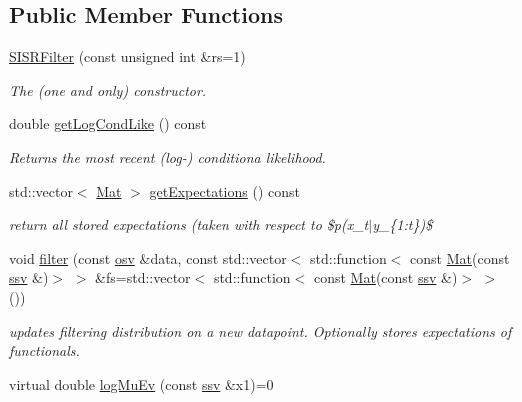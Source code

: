 \subsection*{Public Member Functions}
\begin{DoxyCompactItemize}
\item 
\hyperlink{classSISRFilter_a65ebfb131996dba6a92291e26bad33d2}{S\+I\+S\+R\+Filter} (const unsigned int \&rs=1)
\begin{DoxyCompactList}\small\item\em The (one and only) constructor. \end{DoxyCompactList}\item 
double \hyperlink{classSISRFilter_a2f100a9877d3bb1e94e723e892a39ede}{get\+Log\+Cond\+Like} () const 
\begin{DoxyCompactList}\small\item\em Returns the most recent (log-\/) conditiona likelihood. \end{DoxyCompactList}\item 
std\+::vector$<$ \hyperlink{classSISRFilter_a6563da123e66df0b1140140a5b40d535}{Mat} $>$ \hyperlink{classSISRFilter_a10900ed31e94f3a40b68f1e202cb8b5a}{get\+Expectations} () const 
\begin{DoxyCompactList}\small\item\em return all stored expectations (taken with respect to \$p(x\+\_\+t$\vert$y\+\_\+\{1\+:t\})\$ \end{DoxyCompactList}\item 
void \hyperlink{classSISRFilter_afbffd9e3ff6cc7171f4c9f7052bf9581}{filter} (const \hyperlink{classSISRFilter_ad3449fbd43f19dbda6b80459d729d9bf}{osv} \&data, const std\+::vector$<$ std\+::function$<$ const \hyperlink{classSISRFilter_a6563da123e66df0b1140140a5b40d535}{Mat}(const \hyperlink{classSISRFilter_aeaa3ff0465a0b260710a17238a95212c}{ssv} \&)$>$ $>$ \&fs=std\+::vector$<$ std\+::function$<$ const \hyperlink{classSISRFilter_a6563da123e66df0b1140140a5b40d535}{Mat}(const \hyperlink{classSISRFilter_aeaa3ff0465a0b260710a17238a95212c}{ssv} \&)$>$ $>$())
\begin{DoxyCompactList}\small\item\em updates filtering distribution on a new datapoint. Optionally stores expectations of functionals. \end{DoxyCompactList}\item 
virtual double \hyperlink{classSISRFilter_ad803bdb90865f8982a7e0058a0aaa10f}{log\+Mu\+Ev} (const \hyperlink{classSISRFilter_aeaa3ff0465a0b260710a17238a95212c}{ssv} \&x1)=0

\end{DoxyCompactItemize}

